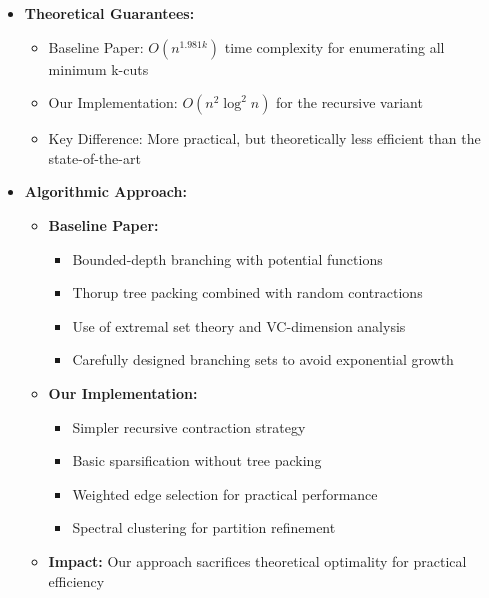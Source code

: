 \documentclass[11pt]{article}
\begin{document}
\begin{itemize}
    \item \textbf{Theoretical Guarantees:}
    \begin{itemize}
        \item Baseline Paper: \( O(n^{1.981k}) \) time complexity for enumerating all minimum k-cuts
        \item Our Implementation: \( O(n^2 \log^2 n) \) for the recursive variant
        \item Key Difference: More practical, but theoretically less efficient than the state-of-the-art
    \end{itemize}

    \item \textbf{Algorithmic Approach:}
    \begin{itemize}
        \item \textbf{Baseline Paper:}
        \begin{itemize}
            \item Bounded-depth branching with potential functions
            \item Thorup tree packing combined with random contractions
            \item Use of extremal set theory and VC-dimension analysis
            \item Carefully designed branching sets to avoid exponential growth
        \end{itemize}
        \item \textbf{Our Implementation:}
        \begin{itemize}
            \item Simpler recursive contraction strategy
            \item Basic sparsification without tree packing
            \item Weighted edge selection for practical performance
            \item Spectral clustering for partition refinement
        \end{itemize}
        \item \textbf{Impact:} Our approach sacrifices theoretical optimality for practical efficiency
    \end{itemize}


\end{itemize}
\end{document}
